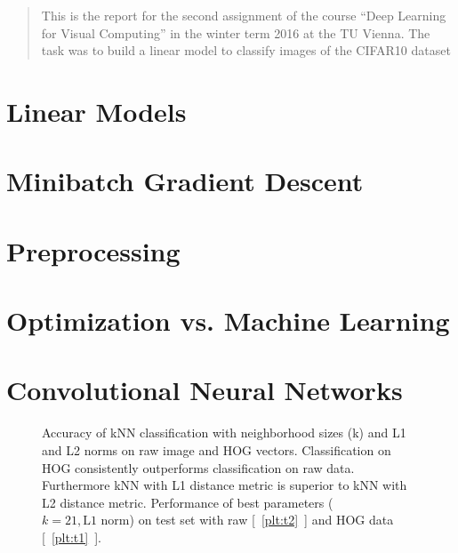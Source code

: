 \newcommand{\ttitle}{Image Classification using Linear Models and CNN \TODO}
\hyphenation{}
\maketitle
{}

\begin{abstract}
This is the report for the second assignment of the course ``Deep Learning for Visual Computing'' in the winter term 2016 at the TU Vienna. The task was to build a linear model to classify images of  the CIFAR10 dataset \TODO
\end{abstract}


\section{Linear Models}

\section{Minibatch Gradient Descent}

\section{Preprocessing}

\section{Optimization vs. Machine Learning}

\section{Convolutional Neural Networks}

\begin{figure}[h!t]
\newcommand{\plotref}[1]{{[~\ref{plt:#1}~]}}
\centering

\caption{Accuracy of kNN classification with neighborhood sizes (k) and L1 and L2 norms on raw image and HOG vectors. Classification on HOG consistently outperforms classification on raw data. Furthermore kNN with L1 distance metric is superior to kNN with L2 distance metric. Performance of best parameters ($k=21, \text{L1 norm}$) on test set with raw \plotref{t2} and HOG data \plotref{t1}. }
\label{figparam}

\end{figure}







